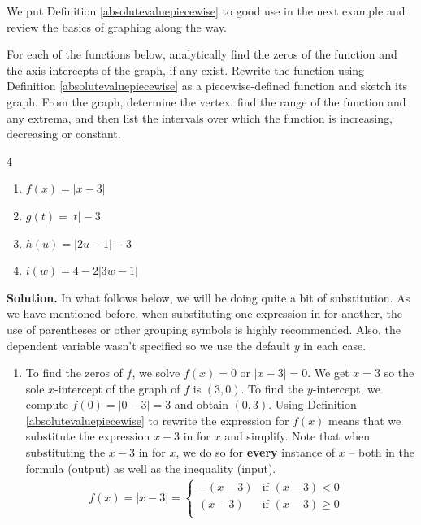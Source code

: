 \documentclass{ximera}
\begin{document}
\medskip

We put Definition \ref{absolutevaluepiecewise} to good use in the next example and review the basics of graphing along the way.


\begin{example}   \label{absvaluegraph1} For each of the functions below, analytically find the zeros of the function and the axis intercepts of the graph, if any exist.  Rewrite the function using Definition \ref{absolutevaluepiecewise} as a piecewise-defined function and sketch its graph.  From the graph, determine the vertex, find the range of the function and any extrema, and then list the intervals over which the function is increasing, decreasing or constant.

\begin{multicols}{4}
\begin{enumerate}

\item  $f(x) = |x - 3|$
\item  $g(t) = |t| - 3$
\item  $h(u) = |2u - 1| - 3$
\item  $i(w) = 4 - 2|3w - 1|$ 

\end{enumerate}
\end{multicols}

{\bf Solution.}  In what follows below, we will be doing quite a bit of substitution.  As we have mentioned before, when substituting one expression in for another, the use of parentheses or other grouping symbols is highly recommended.  Also, the dependent variable wasn't specified so we use the default $y$ in each case.

\begin{enumerate}

\item  To find the zeros of $f$, we solve $f(x) = 0$ or $|x - 3| = 0$.  We get $x = 3$ so  the sole $x$-intercept of the graph of $f$ is $(3, 0)$.  To find the $y$-intercept, we compute $f(0) = |0 - 3| = 3$ and obtain $(0,3)$.     Using Definition \ref{absolutevaluepiecewise} to rewrite the expression for $f(x)$ means that we substitute the expression $x - 3$ in for $x$ and simplify.  Note that when substituting the $x - 3$ in for $x$,  we do so for \textbf{every} instance of $x$  -- both in the formula (output) as well as the inequality (input). \[ \begin{array}{ccc}

f(x) = |x - 3| = \begin{cases} 
      -(x - 3) &  \text{if $(x - 3) < 0$} \\
      (x - 3)  & \text{if $(x - 3) \geq 0$} \\
   \end{cases} &
   

\end{array}\]
\end{enumerate}
\end{example}
\end{document}
